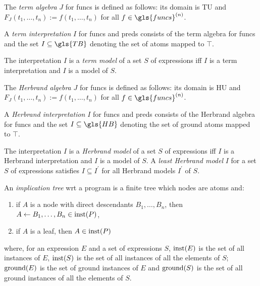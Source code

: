 \begin{dfn}
    The \emph{term algebra} \(J\) for \gls{funcs} is defined as follows:
    its domain is \gls{TU} and \(F_J(t_1,\dotsc,t_n) := f(t_1,\dotsc,t_n)\) for all \(f \in \gls{funcs}^{(n)}\).
    
    A \emph{term interpretation} \(I\) for \gls{funcs} and \gls{preds} consists of the term algebra for \gls{funcs} and the set \(I \subseteq \gls{TB}\) denoting the set of atoms mapped to \(\top\).

    The interpretation \(I\) is a \emph{term model} of a set \(S\) of expressions iff \(I\) is a term interpretation and \(I\) is a model of \(S\).
\end{dfn}

\begin{dfn}
    The \emph{Herbrand algebra} \(J\) for \gls{funcs} is defined as follows:
    its domain is \gls{HU} and \(F_J(t_1,\dotsc,t_n) := f(t_1,\dotsc,t_n)\) for all \(f \in \gls{funcs}^{(n)}\).
    
    A \emph{Herbrand interpretation} \(I\) for \gls{funcs} and \gls{preds} consists of the Herbrand algebra for \gls{funcs} and the set \(I \subseteq \gls{HB}\) denoting the set of ground atoms mapped to \(\top\).

    The interpretation \(I\) is a \emph{Herbrand model} of a set \(S\) of expressions iff \(I\) is a Herbrand interpretation and \(I\) is a model of \(S\).
    A \emph{least Herbrand model} \(I\) for a set \(S\) of expressions satisfies \(I \subseteq I^\prime\) for all Herbrand models \(I^\prime\) of \(S\).
\end{dfn}

\begin{dfn}
    An \emph{implication tree} wrt a program \prog is a finite tree which nodes are atoms and:
    \begin{enumerate}
        \item if \(A\) is a node with direct descendants \(B_1,\dotsc,B_n\), then \(A \leftarrow B_1,\dotsc,B_n \in \operatorname{inst}(P)\),
        \item if \(A\) is a leaf, then \(A \in \operatorname{inst}(P)\)
    \end{enumerate}
    where, for an expression \(E\) and a set of expressions \(S\), \(\operatorname{inst}(E)\) is the set of all instances of \(E\), \(\operatorname{inst}(S)\) is the set of all instances of all the elements of \(S\); \(\operatorname{ground}(E)\) is the set of ground instances of \(E\) and \(\operatorname{ground}(S)\) is the set of all ground instances of all the elements of \(S\).
\end{dfn}

